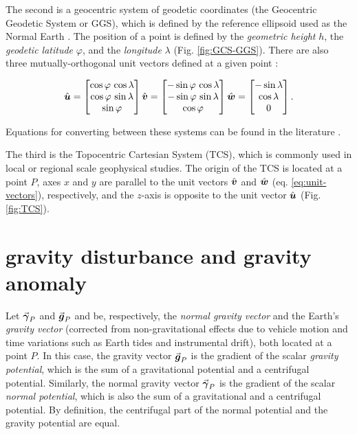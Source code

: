\documentclass[extra]{gji}
\newcommand{\versor}[1]{\hat{\mitbf{#1}}}
\renewcommand{\vector}[1]{\vec{\mitbf{#1}}}
\begin{document}
The second is a geocentric system of geodetic coordinates
(the Geocentric Geodetic System or GGS),
which is defined by the reference ellipsoid used as the Normal Earth
\citep{heiskanen-moritz1967, soler1976, torge2012, bouman_etal2013}.
The position of a point is defined by
the \textit{geometric height} $h$,
the \textit{geodetic latitude} $\varphi$,
and the \textit{longitude} $\lambda$ (Fig. \ref{fig:GCS-GGS}).
There are also three mutually-orthogonal unit vectors defined at a given point
\citep{soler1976}:

\begin{equation}
    \versor{u} =
    \begin{bmatrix}
        \cos\varphi \, \cos\lambda \\
        \cos\varphi \, \sin\lambda \\
        \sin\varphi
    \end{bmatrix}
    \versor{v} =
        \begin{bmatrix}
        -\sin\varphi \, \cos\lambda \\
        -\sin\varphi \, \sin\lambda \\
        \cos\varphi
    \end{bmatrix}
    \versor{w} =
    \begin{bmatrix}
        -\sin\lambda \\
        \cos\lambda \\
        0
    \end{bmatrix} .
    \label{eq:unit-vectors}
\end{equation}

\noindent Equations for converting between these systems can be found in
the literature \citep[e.g.,][]{heiskanen-moritz1967, torge2012,
bouman_etal2013}.

The third is the Topocentric Cartesian System (TCS),
which is commonly used in local or regional scale geophysical studies.
The origin of the TCS is located at a point $P$,
axes $x$ and $y$ are parallel to
the unit vectors $\versor{v}$ and $\versor{w}$
(eq. \ref{eq:unit-vectors}), respectively,
and the $z$-axis is opposite to the unit vector $\versor{u}$
(Fig. \ref{fig:TCS}).


\section{gravity disturbance and gravity anomaly}

Let $\vector{\gamma}_{P}$ and $\vector{g}_{P}$ and be, respectively,
the \textit{normal gravity vector} and the Earth's \textit{gravity vector}
(corrected from non-gravitational effects due to vehicle
motion and time variations such as Earth tides and instrumental drift),
both located at a point $P$.
In this case, the gravity vector $\vector{g}_{P}$ is the
gradient of the scalar \textit{gravity potential},
which is the sum of a gravitational potential and a centrifugal potential.
Similarly, the normal gravity vector $\vector{\gamma}_{P}$ is the
gradient of the scalar \textit{normal potential},
which is also the sum of a gravitational and a centrifugal potential.
By definition, the centrifugal part of
the normal potential and the gravity potential are equal.
\end{document}

